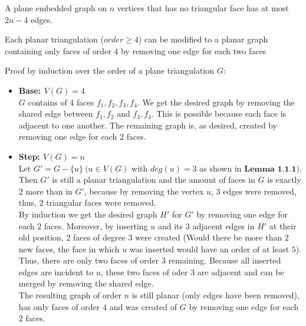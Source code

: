 \documentclass[a4paper]{article}
\begin{document}
	\begin{solution}{19}
		\begin{theorem} {A plane embedded graph on $n$ vertices that has no triangular face has at most $2n-4$ edges.}
			\begin{lemma} {Each planar triangulation ($order \geq 4$) can be modified to a planar graph containing only faces of order $4$ by removing one edge for each two faces}
				
				Proof by induction over the order of a plane triangulation $G$:\\
				\begin{itemize}
					\item \textbf{Base: $V(G)=4$}\\
						$G$ contains of $4$ faces $f_1,f_2,f_3,f_4$. We get the desired graph by removing the shared edge between $f_1, f_2$ and $f_3, f_4$.
						This is possible because each face is adjacent to one another. The remaining graph is, as desired, created by removing one edge for each $2$ faces.
						
					\item \textbf{Step: $V(G)=n$}\\
						Let $G' = G -\{u\} ~ (u \in V(G)$ with $deg(u) = 3$ as shown in $\textbf{Lemma 1.1.1})$. Then $G'$ is still a planar triangulation and the amount of faces in $G$ is exactly $2$ more than in $G'$, because by removing the vertex $u$, $3$ edges were removed, thus, $2$ triangular faces were removed.\\
						By induction we get the desired graph $H'$ for $G'$ by removing one edge for each $2$ faces. Moreover, by inserting $u$ and its $3$ adjacent edges in $H'$ at their old position, $2$ faces of degree $3$ were created (Would there be more than $2$ new faces, the face in which $u$ was inserted would have an order of at least $5$). Thus, there are only two faces of order $3$ remaining. Because all inserted edges are incident to $u$, these two faces of oder $3$ are adjacent and can be merged by removing the shared edge.\\
						The resulting graph of order $n$ is still planar (only edges have been removed), has only faces of order $4$ and was created of $G$ by removing one edge for each $2$ faces. 
					
				\end{itemize}
			
			\end{lemma}
		

\end{theorem}
\end{solution}
\end{document}
